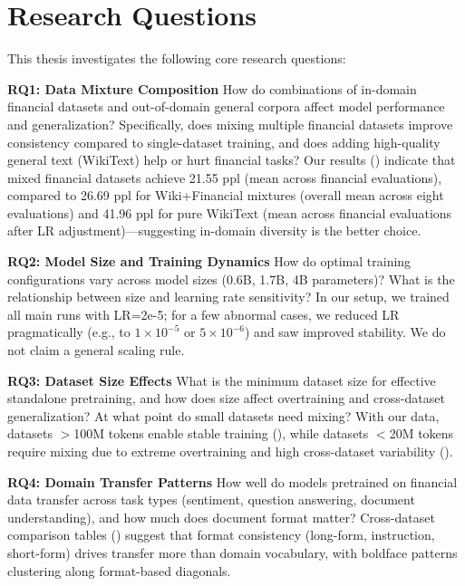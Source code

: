 \section{Research Questions}

This thesis investigates the following core research questions:

\textbf{RQ1: Data Mixture Composition}
How do combinations of in-domain financial datasets and out-of-domain general corpora affect model performance and generalization? Specifically, does mixing multiple financial datasets improve consistency compared to single-dataset training, and does adding high-quality general text (WikiText) help or hurt financial tasks? Our results () indicate that mixed financial datasets achieve 21.55 ppl (mean across financial evaluations), compared to 26.69 ppl for Wiki+Financial mixtures (overall mean across eight evaluations) and 41.96 ppl for pure WikiText (mean across financial evaluations after LR adjustment)—suggesting in-domain diversity is the better choice.

\textbf{RQ2: Model Size and Training Dynamics}
How do optimal training configurations vary across model sizes (0.6B, 1.7B, 4B parameters)? What is the relationship between size and learning rate sensitivity? In our setup, we trained all main runs with LR=2e-5; for a few abnormal cases, we reduced LR pragmatically (e.g., to $1\times10^{-5}$ or $5\times10^{-6}$) and saw improved stability. We do not claim a general scaling rule.

\textbf{RQ3: Dataset Size Effects}
What is the minimum dataset size for effective standalone pretraining, and how does size affect overtraining and cross-dataset generalization? At what point do small datasets need mixing? With our data, datasets $>$100M tokens enable stable training (), while datasets $<$20M tokens require mixing due to extreme overtraining and high cross-dataset variability ().

\textbf{RQ4: Domain Transfer Patterns}
How well do models pretrained on financial data transfer across task types (sentiment, question answering, document understanding), and how much does document format matter? Cross-dataset comparison tables () suggest that format consistency (long-form, instruction, short-form) drives transfer more than domain vocabulary, with boldface patterns clustering along format-based diagonals.

